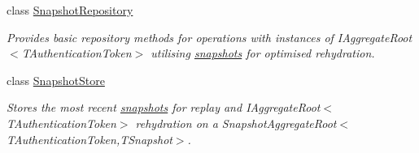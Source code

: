 \begin{DoxyCompactItemize}
class \hyperlink{classCqrs_1_1Snapshots_1_1SnapshotRepository}{Snapshot\+Repository}
\begin{DoxyCompactList}\small\item\em Provides basic repository methods for operations with instances of I\+Aggregate\+Root$<$\+T\+Authentication\+Token$>$ utilising \hyperlink{classCqrs_1_1Snapshots_1_1Snapshot}{snapshots} for optimised rehydration. \end{DoxyCompactList}\item 
class \hyperlink{classCqrs_1_1Snapshots_1_1SnapshotStore}{Snapshot\+Store}
\begin{DoxyCompactList}\small\item\em Stores the most recent \hyperlink{classCqrs_1_1Snapshots_1_1Snapshot}{snapshots} for replay and I\+Aggregate\+Root$<$\+T\+Authentication\+Token$>$ rehydration on a Snapshot\+Aggregate\+Root$<$\+T\+Authentication\+Token,\+T\+Snapshot$>$. \end{DoxyCompactList}\end{DoxyCompactItemize}
